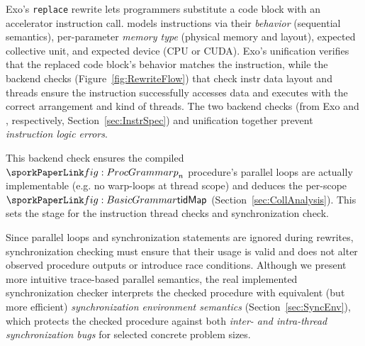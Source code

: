 Exo's \texttt{replace} rewrite lets programmers substitute a code block with an accelerator instruction call.
\sporkName{} models instructions via their \emph{behavior} (sequential semantics), per-parameter \emph{memory type} (physical memory and layout), expected collective unit, and expected device (CPU or CUDA).
%
Exo's unification verifies that the replaced code block's behavior matches the instruction,
while the backend checks (Figure~\ref{fig:RewriteFlow}) that check instr data layout and threads ensure the instruction successfully accesses data and executes with the correct arrangement and kind of threads.
The two backend checks (from Exo and \sporkName{}, respectively, Section~\ref{sec:InstrSpec}) and unification together prevent \emph{instruction logic errors}.

This backend check ensures the compiled $\sporkp_n$ procedure's parallel loops are actually implementable (e.g. no warp-loops at thread scope) and deduces the per-scope $\sporktidMap$ (Section~\ref{sec:CollAnalysis}).
This sets the stage for the instruction thread checks and synchronization check.

 Since parallel loops and synchronization statements are ignored during rewrites, synchronization checking must ensure that their usage is valid and does not alter observed procedure outputs or introduce race conditions.
Although we present more intuitive trace-based parallel semantics,
the real implemented synchronization checker interprets the checked procedure with equivalent (but more efficient) \emph{synchronization environment semantics} (Section~\ref{sec:SyncEnv}),
which protects the checked procedure against both \emph{inter- and intra-thread synchronization bugs} for selected concrete problem sizes.

